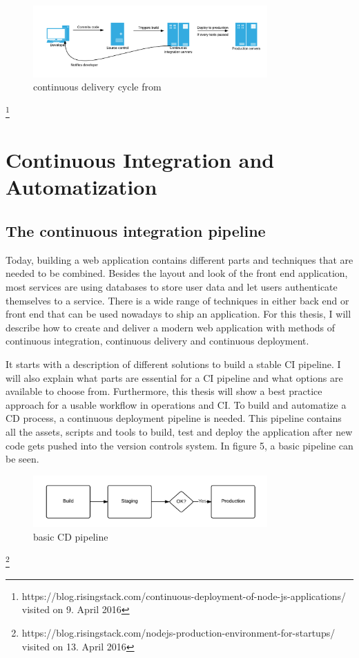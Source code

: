 \begin{figure}[h!]
  \centering
  \includegraphics[width=0.8\textwidth]{images/cd.png}
  \caption{continuous delivery cycle from}
\end{figure}
\footnote{https://blog.risingstack.com/continuous-deployment-of-node-js-applications/ visited on 9. April 2016}

\newpage

\section{Continuous Integration and Automatization}
\label{section:Continuous Integration and Automatization}

\subsection{The continuous integration pipeline}
Today, building a web application contains different parts and techniques that are needed to be combined. Besides the layout and look of the front end application, most services are using databases to store user data and let users authenticate themselves to a service. There is a wide range of techniques in either back end or front end that can be used nowadays to ship an application. For this thesis, I will describe how to create and deliver a modern web
application with methods of continuous integration, continuous delivery and continuous deployment.

It starts with a description of different solutions to build a stable CI pipeline. I will also explain what parts are essential for a CI pipeline and what options are available to choose from. Furthermore, this thesis will show a best practice approach for a usable workflow in operations and CI. To build and automatize a CD process, a continuous deployment pipeline is needed. This pipeline contains all the assets, scripts and tools to build, test and deploy the application after new code gets pushed into the version controls system. In figure 5, a basic pipeline can be seen.


\begin{figure}[h!]
  \centering
  \includegraphics[width=0.8\textwidth]{images/pipeline.png}
  \caption{basic CD pipeline}
\end{figure}
\footnote{https://blog.risingstack.com/nodejs-production-environment-for-startups/ visited on 13. April 2016}

